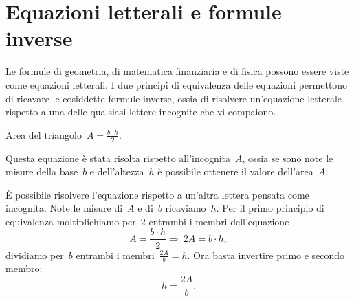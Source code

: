 % 
% 

\section{Equazioni letterali e formule inverse}
\label{sec:compl1_formuleinverse}

Le formule di geometria, di matematica finanziaria e di fisica possono 
essere viste come equazioni letterali.
I due principi di equivalenza delle equazioni permettono di ricavare le 
cosiddette formule inverse, ossia di risolvere
un'equazione letterale rispetto a una delle qualsiasi lettere incognite 
che vi compaiono.

 \begin{esempio}{}{}
Area del triangolo~\(A=\frac{b\cdot h}{2}\).

Questa equazione è stata risolta rispetto all'incognita~\(A\), ossia se 
sono note le misure della base~\(b\) e dell'altezza~\(h\)
è possibile ottenere il valore dell'area~\(A\).

È possibile risolvere l'equazione rispetto a un'altra lettera pensata 
come incognita.
Note le misure di~\(A\) e di~\(b\) ricaviamo~\(h\). 
Per il primo principio di equivalenza moltiplichiamo per~\(2\)
entrambi i membri dell'equazione
\[A=\frac{b\cdot h}{2}\Rightarrow~2A=b\cdot h,\]
dividiamo per~\(b\) entrambi i membri~\(\frac{2A}{b}=h\).
Ora basta invertire primo e secondo membro: \[h=\frac{2A}{b}.\]
\end{esempio}

